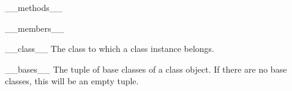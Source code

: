 \begin{memberdesc}[object]{__methods__}
\end{memberdesc}

\begin{memberdesc}[object]{__members__}
\end{memberdesc}

\begin{memberdesc}[instance]{__class__}
The class to which a class instance belongs.
\end{memberdesc}

\begin{memberdesc}[class]{__bases__}
The tuple of base classes of a class object.  If there are no base
classes, this will be an empty tuple.
\end{memberdesc}
